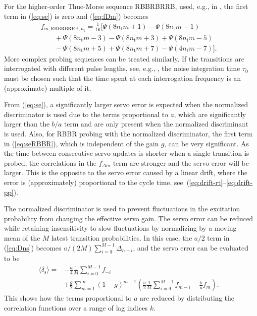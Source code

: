 \documentclass[10pt,a4paper]{iopart}
\newcommand{\eqref}[1]{(\ref{#1})}
\begin{document}
For the higher-order Thue-Morse sequence RBBRBRRB, used, e.g., in \cite{Baynham2019PhD}, the first term in \eqref{eq:se} is zero and \eqref{eq:fDm} becomes
\begin{eqnarray}
f_{m,\mathrm{RBBRBRRB},n_\mathrm{t}} = \frac{1}{16}
[ \Psi(8 n_\mathrm{t} m+1) - \Psi(8 n_\mathrm{t} m-1) \nonumber \\
\quad \quad + \Psi(8 n_\mathrm{t} m-3) - \Psi(8 n_\mathrm{t} m+3) + \Psi(8 n_\mathrm{t} m-5) \nonumber \\
\quad \quad - \Psi(8 n_\mathrm{t} m+5) + \Psi(8 n_\mathrm{t} m+7) - \Psi(4 n_\mathrm{t} m -7) ]. \label{eq:fDmRBBRBRRB}
\end{eqnarray}
More complex probing sequences can be treated similarly. If the transitions are interrogated with different pulse lengths, see, e.g., \cite{Steinel2022a}, the noise integration time $\tau_0$ must be chosen such that the time spent at each interrogation frequency is an (approximate) multiple of it.

From \eqref{eq:se}, a significantly larger servo error is expected when the normalized discriminator is used due to the terms proportional to $a$, which are significantly larger than the $b/a$ term and are only present when the normalized discriminant is used. Also, for RBBR probing with the normalized discriminator, the first term in \eqref{eq:seRBBR}, which is independent of the gain $g$, can be very significant. As the time between consecutive servo updates is shorter when a single transition is probed, the correlations in the $f_{\Delta m}$ term are stronger and the servo error will be larger. This is the opposite to the servo error caused by a linear drift, where the error is (approximately) proportional to the cycle time, see~(\ref{eq:drift-rt}--\ref{eq:drift-pp}).

The normalized discriminator is used to prevent fluctuations in the excitation probability from changing the effective servo gain. The servo error can be reduced while retaining insensitivity to slow fluctuations by normalizing by a moving mean of the $M$ latest transition probabilities. In this case, the $a/2$ term in \eqref{eq:Dns} becomes $a/(2M) \sum_{i = 0}^{M-1} \Delta_{n-i}$, and the servo error can be evaluated to be
\begin{eqnarray}
\langle \delta_\mathrm{s}\rangle = & - \frac{a}{4} \frac{1}{M} \sum_{i=0}^{M-1} f_{-i} \nonumber \\
& + \frac{g}{2} \sum_{m=1}^\infty (1-g)^{m-1} \left( \frac{a}{2} \frac{1}{M} \sum_{i=0}^{M-1} f_{m-i} - \frac{b}{a} f_{m} \right).  \label{eq:se-mm}
\end{eqnarray}
This shows how the terms proportional to $a$ are reduced by distributing the correlation functions over a range of lag indices $k$.
\end{document}
